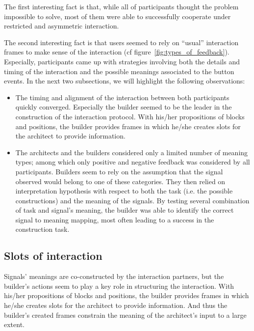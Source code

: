 The first interesting fact is that, while all of participants thought the problem impossible to solve, most of them were able to successfully cooperate under restricted and asymmetric interaction.

The second interesting fact is that users seemed to rely on ``usual'' interaction frames to make sense of the interaction (cf figure~\ref{fig:types_of_feedback}). Especially, participants came up with strategies involving both the details and timing of the interaction and the possible meanings associated to the button events. In the next two subsections, we will highlight the following observations: 

\begin{itemize}

\item The timing and alignment of the interaction between both participants quickly converged. Especially the builder seemed to be the leader in the construction of the interaction protocol. With his/her propositions of blocks and positions, the builder provides frames in which he/she creates slots for the architect to provide information.

\item The architects and the builders considered only a limited number of meaning types; among which only positive and negative feedback was considered by all participants. Builders seem to rely on the assumption that the signal observed would belong to one of these categories. They then relied on interpretation hypothesis with respect to both the task (i.e. the possible constructions) and the meaning of the signals. By testing several combination of task and signal's meaning, the builder was able to identify the correct signal to meaning mapping, most often leading to a success in the construction task.

\end{itemize}

\subsection{Slots of interaction}

Signals' meanings are co-constructed by the interaction partners, but the builder's actions seem to play a key role in structuring the interaction. With his/her propositions of blocks and positions, the builder provides frames in which he/she creates slots for the architect to provide information. And thus the builder's created frames constrain the meaning of the architect's input to a large extent. 

